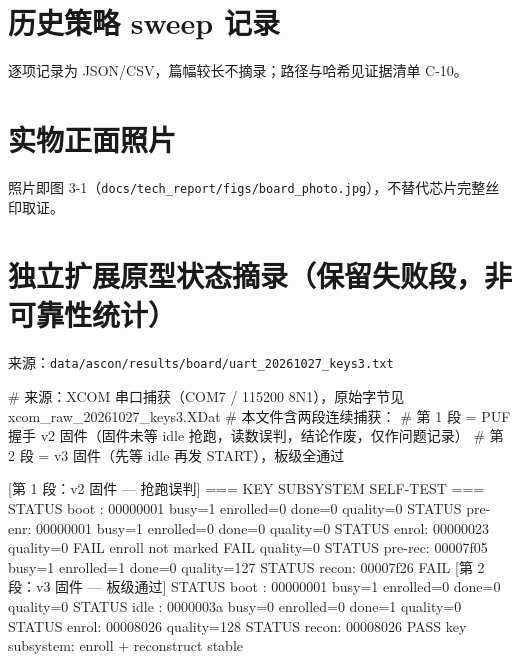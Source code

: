 \Needspace{85pt}

\section{历史策略 sweep 记录}\label{ux5386ux53f2ux7b56ux7565-sweep-ux8bb0ux5f55}

逐项记录为 JSON/CSV，篇幅较长不摘录；路径与哈希见证据清单 C-10。

\Needspace{85pt}

\section{实物正面照片}

照片即图 3-1（\texttt{docs/\allowbreak{}tech\_\allowbreak{}report/\allowbreak{}figs/\allowbreak{}board\_\allowbreak{}photo.\allowbreak{}jpg}），不替代芯片完整丝印取证。

\Needspace{85pt}

\section{独立扩展原型状态摘录（保留失败段，非可靠性统计）}

来源：\texttt{data/\allowbreak{}ascon/\allowbreak{}results/\allowbreak{}board/\allowbreak{}uart\_\allowbreak{}20261027\_\allowbreak{}keys3.\allowbreak{}txt}

\begin{codeblock}
# 来源：XCOM 串口捕获（COM7 / 115200 8N1），原始字节见 xcom_raw_20261027_keys3.XDat
# 本文件含两段连续捕获：
#   第 1 段 = PUF 握手 v2 固件（固件未等 idle 抢跑，读数误判，结论作废，仅作问题记录）
#   第 2 段 = v3 固件（先等 idle 再发 START），板级全通过

[第 1 段：v2 固件 — 抢跑误判]
=== KEY SUBSYSTEM SELF-TEST ===
STATUS boot   : 00000001 busy=1 enrolled=0 done=0 quality=0
STATUS pre-enr: 00000001 busy=1 enrolled=0 done=0 quality=0
STATUS enrol: 00000023 quality=0
FAIL enroll not marked
FAIL quality=0
STATUS pre-rec: 00007f05 busy=1 enrolled=1 done=0 quality=127
STATUS recon: 00007f26
FAIL
[第 2 段：v3 固件 — 板级通过]
STATUS boot   : 00000001 busy=1 enrolled=0 done=0 quality=0
STATUS idle   : 0000003a busy=0 enrolled=0 done=1 quality=0
STATUS enrol: 00008026 quality=128
STATUS recon: 00008026
PASS key subsystem: enroll + reconstruct stable
\end{codeblock}

